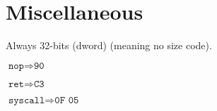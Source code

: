 \documentclass{article}
\begin{document}
\section{Miscellaneous}
\begin{minipage}{\textwidth}

    Always 32-bits (dword) (meaning no size code).

$\texttt{nop} \Rightarrow \texttt{90}$

$\texttt{ret} \Rightarrow \texttt{C3}$

$\texttt{syscall} \Rightarrow \texttt{0F 05}$

\end{minipage}
\end{document}
